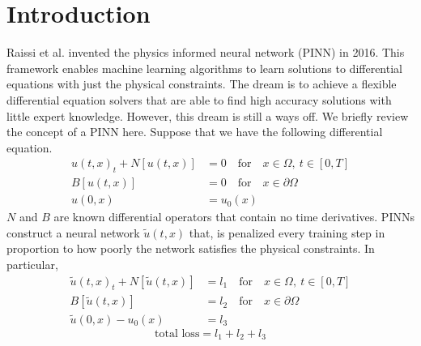 \documentclass[12pt]{article}
\def\~{\tilde}
\begin{document}
\vfill
\newpage
\section{Introduction}

Raissi et al. \cite{pinns} invented the physics informed neural network (PINN) in 2016. This framework enables machine learning algorithms to learn solutions to differential equations with just the physical constraints. The dream is to achieve a flexible differential equation solvers that are able to find high accuracy solutions with little expert knowledge. However, this dream is still a ways off. We briefly review the concept of a PINN here. Suppose that we have the following differential equation.
\begin{align*}
	u(t,x)_t + N[u(t,x)] &= 0 \quad \text{for} \quad x \in \Omega, \: t \in [0,T]\\
	B[u(t,x)] &= 0 \quad \text{for} \quad x \in \partial \Omega\\
	u(0,x) &= u_0(x)
\end{align*}
$N$ and $B$ are known differential operators that contain no time derivatives. PINNs construct a neural network $\~u(t,x)$ that, is penalized every training step in proportion to how poorly the network satisfies the physical constraints. In particular,
\begin{align*}
	\~u(t,x)_t + N[\~u(t,x)] &= l_1 \quad \text{for} \quad x \in \Omega, \: t \in [0,T]\\
	B[\~u(t,x)] &= l_2 \quad \text{for} \quad x \in \partial \Omega\\
	\~u(0,x) - u_0(x)& = l_3
\end{align*}
\begin{equation*}
\text{total loss} = l_1 + l_2 + l_3
\end{equation*}
\end{document}
